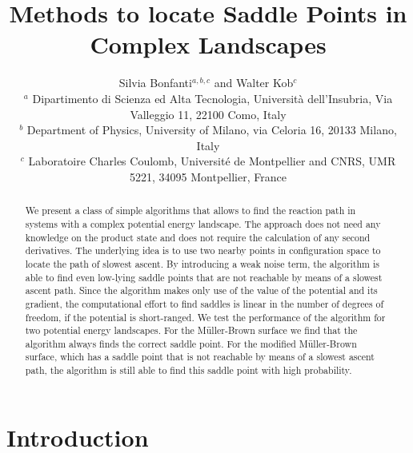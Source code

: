 \documentclass[aip,pre,twocolumn,reprint]{revtex4-1}
\begin{document}


\title{Methods to locate Saddle Points in Complex Landscapes}

\author{ Silvia Bonfanti$^{a,b,c}$ and Walter Kob$^{c}$\\
$^a$ Dipartimento di Scienza ed Alta Tecnologia,  Universit\`a dell'Insubria, 
Via Valleggio 11, 22100 Como, Italy \\
$^b$ Department of Physics, University of Milano, via Celoria 16, 20133 Milano, Italy\\
$^c$ Laboratoire Charles Coulomb, Universit\'e de Montpellier and CNRS, UMR 5221, 
34095 Montpellier, France}


\begin{abstract}
We present a class of simple algorithms that allows to find the reaction
path in systems with a complex potential energy landscape. The approach
does not need any knowledge on the product state and does not require
the calculation of any second derivatives. The underlying idea is to
use two nearby points in configuration space to locate the path of
slowest ascent.  By introducing a weak noise term, the algorithm is
able to find even low-lying saddle points that are not reachable by
means of a slowest ascent path.  Since the algorithm makes only use of
the value of the potential and its gradient, the computational effort
to find saddles is linear in the number of degrees of freedom, if the
potential is short-ranged. We test the performance of the algorithm
for two potential energy landscapes.  For the M\"uller-Brown surface
we find that the algorithm always finds the correct saddle point. For
the modified M\"uller-Brown surface, which has a saddle point that is
not reachable by means of a slowest ascent path, the algorithm is still
able to find this saddle point with high probability.

\end{abstract}

\maketitle


\section{Introduction}
\label{sec1}
\end{document}
